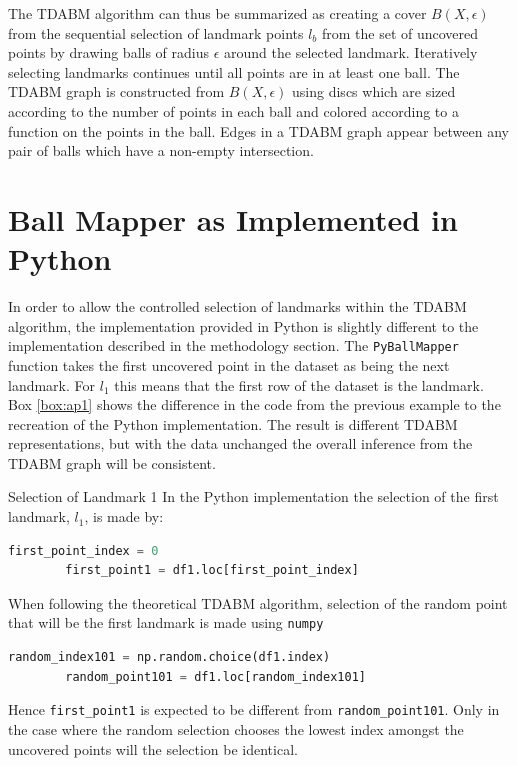 \documentclass{article}
\begin{document}
The TDABM algorithm can thus be summarized as creating a cover $B(X,\epsilon)$ from the sequential selection of landmark points $l_b$ from the set of uncovered points by drawing balls of radius $\epsilon$ around the selected landmark. Iteratively selecting landmarks continues until all points are in at least one ball. The TDABM graph is constructed from $B(X,\epsilon)$ using discs which are sized according to the number of points in each ball and colored according to a function on the points in the ball. Edges in a TDABM graph appear between any pair of balls which have a non-empty intersection.   



\section{Ball Mapper as Implemented in Python}
\label{sec:art}

In order to allow the controlled selection of landmarks within the TDABM algorithm, the implementation provided in Python is slightly different to the implementation described in the methodology section. The \texttt{PyBallMapper} function takes the first uncovered point in the dataset as being the next landmark. For $l_1$ this means that the first row of the dataset is the landmark.  Box \ref{box:ap1} shows the difference in the code from the previous example to the recreation of the Python implementation. The result is different TDABM representations, but with the data unchanged the overall inference from the TDABM graph will be consistent. 

\begin{mybox}[label=box:ap1]{Selection of Landmark 1}
	In the Python implementation the selection of the first landmark, $l_1$, is made by:
	\begin{lstlisting}[language=Python]
		first_point_index = 0
		first_point1 = df1.loc[first_point_index]
	\end{lstlisting}
	When following the theoretical TDABM algorithm, selection of the random point that will be the first landmark is made using \texttt{numpy}
	\begin{lstlisting}[language=Python]
		random_index101 = np.random.choice(df1.index)
		random_point101 = df1.loc[random_index101]
	\end{lstlisting}
	Hence \texttt{first\_point1} is expected to be different from \texttt{random\_point101}. Only in the case where the random selection chooses the lowest index amongst the uncovered points will the selection be identical.
\end{mybox}
\end{document}
